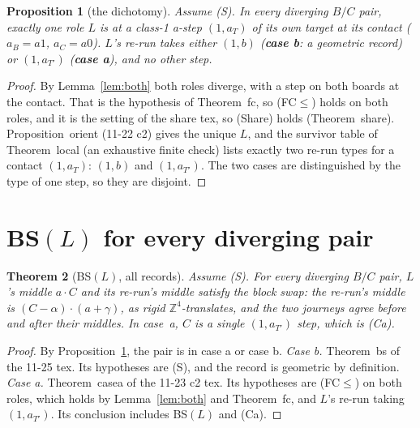 \documentclass[11pt]{article}
\newtheorem{theorem}{Theorem}\newtheorem{lemma}[theorem]{Lemma}\newtheorem{proposition}[theorem]{Proposition}
\theoremstyle{definition}\newtheorem{definition}[theorem]{Definition}\newtheorem{remark}[theorem]{Remark}
\newcommand{\Z}{\mathbb Z}
\begin{document}
\begin{proposition}[the dichotomy]\label{prop:dich}
Assume (S). In every diverging $B/C$ pair, exactly one role $L$ is at a class-1 a-step $(1,a_T)$ of its own target at its contact ($a_B=a1$, $a_C=a0$). $L$'s re-run takes either $(1,b)$ (\textbf{case b}: a geometric record) or $(1,a_{T'})$ (\textbf{case a}), and no other step.
\end{proposition}
\begin{proof}
By Lemma~\ref{lem:both} both roles diverge, with a step on both boards at the contact. That is the hypothesis of Theorem~fc, so (FC$\le$) holds on both roles, and it is the setting of the share tex, so (Share) holds (Theorem~share). Proposition~orient (11-22 c2) gives the unique $L$, and the survivor table of Theorem~local (an exhaustive finite check) lists exactly two re-run types for a contact $(1,a_T)$: $(1,b)$ and $(1,a_{T'})$. The two cases are distinguished by the type of one step, so they are disjoint.
\end{proof}

\section{BS$(L)$ for every diverging pair}\label{sec:bs}
\begin{theorem}[BS$(L)$, all records]\label{thm:bsall}
Assume (S). For every diverging $B/C$ pair, $L$'s middle $a\cdot C$ and its re-run's middle satisfy the block swap: the re-run's middle is $(C-\alpha)\cdot(a+\gamma)$, as rigid $\Z^4$-translates, and the two journeys agree before and after their middles. In case~a, $C$ is a single $(1,a_{T'})$ step, which is (Ca).
\end{theorem}
\begin{proof}
By Proposition~\ref{prop:dich}, the pair is in case a or case b.
\emph{Case b.} Theorem~bs of the 11-25 tex. Its hypotheses are (S), and the record is geometric by definition.
\emph{Case a.} Theorem~casea of the 11-23 c2 tex. Its hypotheses are (FC$\le$) on both roles, which holds by Lemma~\ref{lem:both} and Theorem~fc, and $L$'s re-run taking $(1,a_{T'})$. Its conclusion includes BS$(L)$ and (Ca).
\end{proof}
\end{document}

